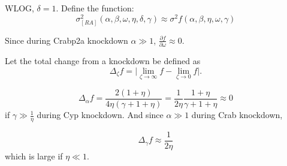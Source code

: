 WLOG, $\delta=1$. Define the function:
\[
\sigma_{[RA]}^{2}(\alpha,\beta,\omega,\eta,\delta,\gamma)\approx\sigma^{2}f(\alpha,\beta,\eta,\omega,\gamma)
\]


Since during Crabp2a knockdown $\alpha\gg1$, $\frac{\partial f}{\partial\omega}\approx0$.

Let the total change from a knockdown be defined as
\[
\Delta_{\zeta}f=\vert\lim_{\zeta\rightarrow\infty}f-\lim_{\zeta\rightarrow0}f\vert.
\]

\[
\Delta_{\alpha}f=\frac{2(1+\eta)}{4\eta(\gamma+1+\eta)}=\frac{1}{2\eta}\frac{1+\eta}{\gamma+1+\eta}\approx0
\]
 if $\gamma\gg\frac{1}{\eta}$ during Cyp knockdown. And since $\alpha\gg1$
during Crab knockdown,

\[
\Delta_{\gamma}f\approx\frac{1}{2\eta}
\]
 which is large if $\eta\ll1$.
